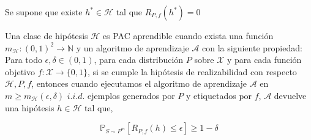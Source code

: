 \begin{frame}
    
    \begin{postulate}
    Se supone que existe $h^*\in \mathcal{H}$ tal que $R_{P,f}(h^*) = 0$
    \end{postulate}
    
    \pause

    \begin{definition}
        Una clase de hipótesis $\mathcal{H}$ es PAC aprendible cuando exista una función $m_{\mathcal{H}}:(0,1)^2 \to \mathbb{N}$ y un algoritmo de aprendizaje $\mathcal{A}$ con la siguiente propiedad: Para todo $\epsilon, \delta \in (0,1)$, para cada distribución $P$ sobre $\mathcal{X}$ y para cada función objetivo $f:\mathcal{X} \to \{0,1\}$, si se cumple la hipótesis de realizabilidad con respecto $\mathcal{H}, P,f$, entonces cuando ejecutamos el algoritmo de aprendizaje $\mathcal{A}$ en $m \geq m_{\mathcal{H}}(\epsilon,\delta)$ $i.i.d.$ ejemplos generados por $P$ y etiquetados por $f$, $\mathcal{A}$ devuelve una hipótesis $h \in \mathcal{H}$ tal que,
        
            \begin{equation}
                \mathbb{P}_{S\sim P^m}[R_{P,f}(h) \leq \epsilon] \geq 1 - \delta
            \end{equation}
    \end{definition}
    
\end{frame}


